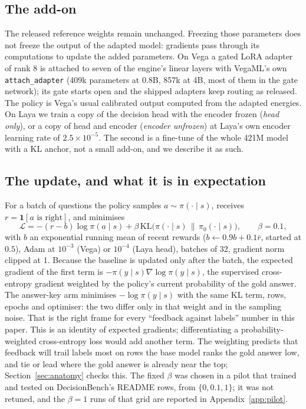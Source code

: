 \documentclass[11pt]{article}
\newcommand{\KL}{\mathrm{KL}}
\begin{document}
\subsection{The add-on}
The released reference weights remain unchanged. Freezing those parameters does not freeze the output of the adapted model: gradients pass through its computations to update the added parameters. On Vega a gated LoRA adapter~\citep{hu2022lora} of rank 8 is attached to seven of the engine's linear layers with VegaML's own \texttt{attach\_adapter} (409k parameters at 0.8B, 857k at 4B, most of them in the gate network); its gate starts open and the shipped adapters keep routing as released. The policy is Vega's usual calibrated output computed from the adapted energies. On Laya we train a copy of the decision head with the encoder frozen (\emph{head only}), or a copy of head and encoder (\emph{encoder unfrozen}) at Laya's own encoder learning rate of $2.5\times10^{-5}$. The second is a fine-tune of the whole 421M model with a KL anchor, not a small add-on, and we describe it as such.

\subsection{The update, and what it is in expectation}
For a batch of questions the policy samples $a\sim\pi(\cdot\mid s)$, receives $r=\mathbf 1[a\text{ is right}]$, and minimises
\begin{equation}
\mathcal L = -(r-b)\log\pi(a\mid s) + \beta\,\KL\big(\pi(\cdot\mid s)\,\|\,\pi_0(\cdot\mid s)\big),\qquad \beta=0.1,
\label{eq:loss}
\end{equation}
with $b$ an exponential running mean of recent rewards ($b\leftarrow0.9b+0.1\bar r$, started at $0.5$), Adam at $10^{-3}$ (Vega) or $10^{-4}$ (Laya head), batches of 32, gradient norm clipped at 1. Because the baseline is updated only after the batch, the expected gradient of the first term is $-\pi(y\mid s)\nabla\log\pi(y\mid s)$, the supervised cross-entropy gradient weighted by the policy's current probability of the gold answer. The answer-key arm minimises $-\log\pi(y\mid s)$ with the same KL term, rows, epochs and optimiser: the two differ only in that weight and in the sampling noise. That is the right frame for every ``feedback against labels'' number in this paper. This is an identity of expected gradients; differentiating a probability-weighted cross-entropy loss would add another term. The weighting predicts that feedback will trail labels most on rows the base model ranks the gold answer low, and tie or lead where the gold answer is already near the top; Section~\ref{sec:anatomy} checks this. The fixed $\beta$ was chosen in a pilot that trained and tested on DecisionBench's README rows, from $\{0, 0.1, 1\}$; it was not retuned, and the $\beta=1$ runs of that grid are reported in Appendix~\ref{app:pilot}.
\end{document}
